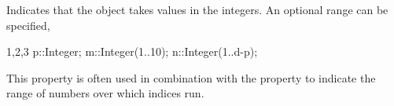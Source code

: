 
Indicates that the object takes values in the integers. An optional
range can be specified,
\begin{screen}{1,2,3}
p::Integer;
m::Integer(1..10);
n::Integer(1..d-p);
\end{screen}
This property is often used in combination with the 
property to indicate the range of numbers over which indices run.


